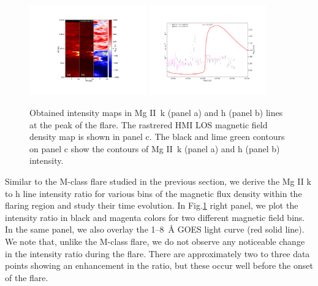 \begin{figure}[ht!]
    \centering
    \includegraphics[trim={6cm 3cm 6cm 3cm},clip,width=0.45\textwidth]{Figures/contour_paper_plot_oct28.pdf}
    \includegraphics[trim={3cm 2cm 2cm 3cm},clip,width=0.45\textwidth]{Figures/Oct-22-2014-optical-dep-ev-2.pdf}
    \caption{Obtained intensity maps in Mg II~k (panel a) and h (panel b) lines at the peak of the flare. The rastrered HMI LOS magnetic field density map is shown in panel c. The black and lime green contours on panel c show the contours of Mg II~k (panel a) and h (panel b) intensity.}
\label{fig:align_raster_flare2}
\end{figure}

Similar to the M-class flare studied in the previous section, we derive the Mg II k to h line intensity ratio for various bins of the magnetic flux density within the flaring region and study their time evolution. In Fig.\ref{fig:align_raster_flare2} right panel, we plot the intensity ratio in black and magenta colors for two different magnetic field bins. In the same panel, we also overlay the 1{--}8~{\AA} GOES light curve (red solid line). We note that, unlike the M-class flare, we do not observe any noticeable change in the intensity ratio during the flare. There are approximately two to three data points showing an enhancement in the ratio, but these occur well before the onset of the flare.

